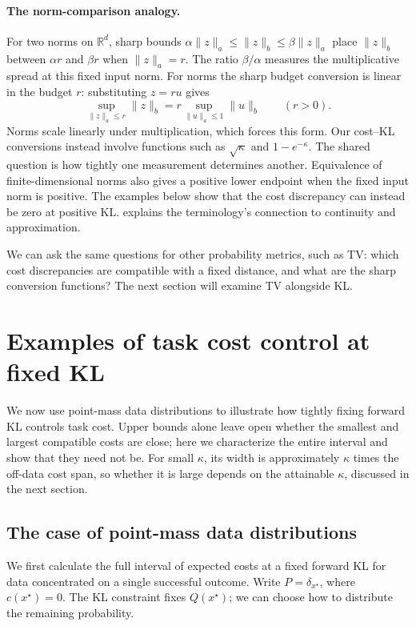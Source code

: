\documentclass[11pt,twoside]{article}
\newcommand{\R}{\mathbb R}
\theoremstyle{definition}
\theoremstyle{remark}
\begin{document}
\paragraph{The norm-comparison analogy.}
For two norms on \(\R^d\), sharp bounds
\(\alpha\|z\|_a\le\|z\|_b\le\beta\|z\|_a\) place
\(\|z\|_b\) between \(\alpha r\) and \(\beta r\) when
\(\|z\|_a=r\). The ratio \(\beta/\alpha\) measures the
multiplicative spread at this fixed input norm.
For norms the sharp budget conversion is linear in the budget \(r\):
substituting \(z=ru\) gives
\[
 \sup_{\|z\|_a\le r}\|z\|_b
 =r\sup_{\|u\|_a\le1}\|u\|_b
 \qquad(r>0).
\]
Norms scale linearly under multiplication, which forces this form.
Our cost--KL conversions instead involve functions such as
\(\sqrt\kappa\) and \(1-e^{-\kappa}\). The shared question is how tightly
one measurement determines another. Equivalence of finite-dimensional
norms also gives a positive lower endpoint when the fixed input norm is
positive. The examples below show that the cost discrepancy can instead
be zero at positive KL. 
explains the terminology's connection to continuity and approximation.

We can ask the same questions for other probability metrics, such as
TV: which cost discrepancies are compatible with a fixed distance,
and what are the sharp conversion functions? The next section will
examine TV alongside KL.

\section{Examples of task cost control at fixed KL}
\label{sec:binary}
We now use point-mass data distributions to illustrate how tightly
fixing forward KL controls task cost. Upper bounds alone leave open
whether the smallest and largest compatible costs are close; here we
characterize the entire interval and show that they need not be.
For small \(\kappa\), its width is approximately \(\kappa\) times the
off-data cost span, so whether it is large depends on the attainable
\(\kappa\), discussed in the next section.

\subsection{The case of point-mass data distributions}
\label{sec:fixed-kl-interval}

We first calculate the full interval of expected costs at a fixed
forward KL for data concentrated on a single successful outcome.
Write \(P=\delta_{x^\star}\), where \(c(x^\star)=0\).
The KL constraint fixes \(Q(x^\star)\); we can choose how to
distribute the remaining probability.
\end{document}
